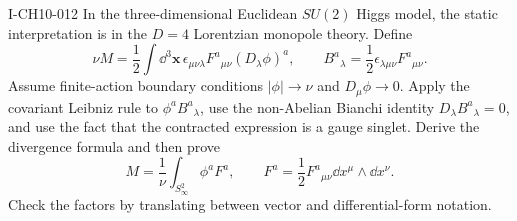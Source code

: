 \begin{exercise}{I-CH10-012}
In the three-dimensional Euclidean $SU(2)$ Higgs model, the static
interpretation is in the $D=4$ Lorentzian monopole theory.  Define
\[
  \nu M=\frac12\int\dd^3\mathbf x\,
  \epsilon_{\mu\nu\lambda}F^a{}_{\mu\nu}(D_\lambda\phi)^a,
  \qquad
  B^a{}_\lambda=\frac12\epsilon_{\lambda\mu\nu}F^a{}_{\mu\nu}.
\]
Assume finite-action boundary conditions $|\phi|\to\nu$ and
$D_\mu\phi\to0$.  Apply the covariant Leibniz rule to
$\phi^aB^a{}_\lambda$, use the non-Abelian Bianchi identity
$D_\lambda B^a{}_\lambda=0$, and use the fact that the contracted expression is
a gauge singlet.  Derive the divergence formula and then prove
\[
  M=\frac1\nu\int_{S^2_\infty}\phi^aF^a,
  \qquad F^a=\frac12F^a{}_{\mu\nu}\dd x^\mu\wedge\dd x^\nu.
\]
Check the factors by translating between vector and differential-form notation.
\end{exercise}
